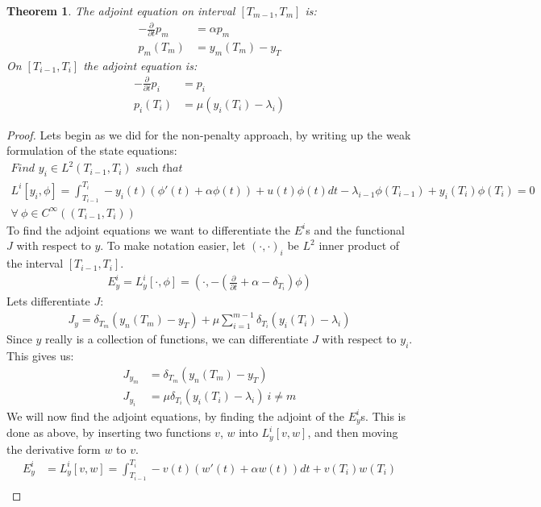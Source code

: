 \documentclass[11pt,a4paper]{article}
\newtheorem{theorem}{Theorem}
\begin{document}
\begin{theorem}
The adjoint equation on interval $[T_{m-1},T_m]$ is:
\begin{align*}
-\frac{\partial }{\partial t}p_m &=\alpha p_m  \\
p_m(T_{m}) &= y_m(T_{m})-y_T
\end{align*}
On $[T_{i-1},T_i]$ the adjoint equation is:
\begin{align*}
-\frac{\partial }{\partial t}p_i &=p_i  \\
p_i(T_{i}) &= \mu(y_{i}(T_{i})-\lambda_{i} )
\end{align*}
\end{theorem} 
\begin{proof}
Lets begin as we did for the non-penalty approach, by writing up the weak formulation of the state equations:
\begin{gather*}
\textit{Find $y_i \in L^2(T_{i-1},T_i)$ such that }\\
L^i[y_i,\phi] = \int_{T_{i-1}}^{T_{i}}-y_i(t)(\phi'(t) +\alpha \phi(t))+u(t)\phi(t)dt -\lambda_{i-1}\phi(T_{i-1})+ y_i(T_i)\phi(T_i) =0\\ \forall \ \phi \in C^{\infty}((T_{i-1},T_{i}))
\end{gather*} 
To find the adjoint equations we want to differentiate the $E^i$s and the functional $J$ with respect to $y$. To make notation easier, let $(\cdot,\cdot)_i$ be $L^2$ inner product of the interval $[T_{i-1},T_i]$. 
\begin{align*}
E_y^i=L_y^i[\cdot,\phi]=(\cdot,-(\frac{\partial}{\partial t} + \alpha - \delta_{T_i})\phi) 
\end{align*}
Lets differentiate $J$:
\begin{align*}
J_y = \delta_{T_{m}}(y_n(T_{m})-y_T) + \mu \sum_{i=1}^{m-1} \delta_{T_{i}}(y_{i}(T_i)-\lambda_i ) 
\end{align*}
Since $y$ really is a collection of functions, we can differentiate $J$ with respect to $y_i$. This gives us:
\begin{align*}
J_{y_m} &= \delta_{T_{m}}(y_n(T_{m})-y_T) \\
J_{y_i} &= \mu\delta_{T_{i}}(y_{i}(T_i)-\lambda_i ) \ i\neq m
\end{align*}
We will now find the adjoint equations, by finding the adjoint of the $E_y^i$s. This is done as above, by inserting two functions $v$, $w$ into $L_y^i[v,w]$, and then moving the derivative form $w$ to $v$.
\begin{align*}
E_y^i&=L_y^i[v,w]=\int_{T_{i-1}}^{T_i}-v(t)(w'(t)+\alpha w(t))dt + v(T_i)w(T_i) \\

\end{align*}
\end{proof}
\end{document}
